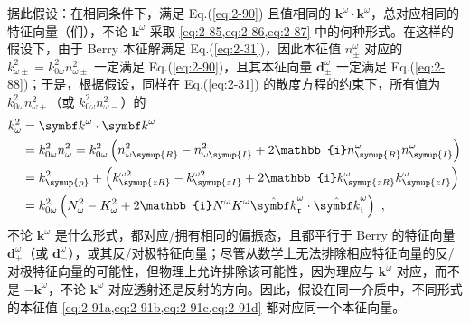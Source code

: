 据此假设：在相同条件下，满足 Eq.(\ref{eq:2-90}) 且值相同的 ${\symbf k}^\omega \cdot {\symbf k}^\omega$，总对应相同的特征向量（们），不论 ${\symbf k}^\omega$ 采取 \cref{eq:2-85,eq:2-86,eq:2-87} 中的何种形式。在这样的假设下，由于 Berry 本征解满足 Eq.(\ref{eq:2-31})，因此本征值 $n^{\omega}_{\pm}$ 对应的 $k^{2}_{\omega\pm} = k^{2}_{0\omega} n^{2}_{\omega\pm}$ 一定满足 Eq.(\ref{eq:2-90})，且其本征向量 ${\symbf d}^{\omega}_{\pm}$ 一定满足 Eq.(\ref{eq:2-88})；于是，根据假设，同样在 Eq.(\ref{eq:2-31}) 的散度方程的约束下，所有值为 $k^{2}_{0\omega} n^{2}_{\omega+}$（或 $k^{2}_{0\omega} n^{2}_{\omega-}$）的
\begin{subequations} \label{eq:2-91}
\abovedisplayskip=6pt
\belowdisplayskip=6pt
\begin{align}
	k^{2}_{\omega} &= {\symbf k}^\omega \cdot {\symbf k}^\omega \label{eq:2-91a}\\ &= k^{2}_{0\omega} n^{2}_{\omega} = k^{2}_{0\omega} \left( n^{2}_{\omega \symup{R}} - n^{2}_{\omega \symup{I}} + 2 \mathbb{i} n^\omega_{\symup{R}} n^\omega_{\symup{I}} \right) \label{eq:2-91b} \\&= k^{2}_{\symup{\rho}} + \left( k^{\omega2}_{\symup{zR}} - k^{\omega2}_{\symup{zI}} + 2 \mathbb{i} k^\omega_{\symup{zR}} k^\omega_{\symup{zI}} \right) \label{eq:2-91c}\\&= k^{2}_{0\omega} \left( N^{2}_{\omega} - K^{2}_{\omega} + 2 \mathbb{i} N^\omega K^\omega \hat{\symbf k}_{\mathfrak{r}}^\omega \cdot \hat{\symbf k}_{\mathfrak{i}}^\omega \right) \label{eq:2-91d} ~,
\end{align}
\end{subequations}
不论 ${\symbf k}^\omega$ 是什么形式，都对应/拥有相同的偏振态，且都平行于 Berry 的特征向量 ${\symbf d}^{\omega}_{+}$（或 ${\symbf d}^{\omega}_{-}$），或其反/对极特征向量；尽管从数学上无法排除相应特征向量的反/对极特征向量的可能性，但物理上允许排除该可能性，因为理应与 ${\symbf k}^\omega$ 对应，而不是 $- {\symbf k}^\omega$，不论 ${\symbf k}^\omega$ 对应透射还是反射的方向。因此，假设在同一介质中，不同形式的本征值 \cref{eq:2-91a,eq:2-91b,eq:2-91c,eq:2-91d} 都对应同一个本征向量。

